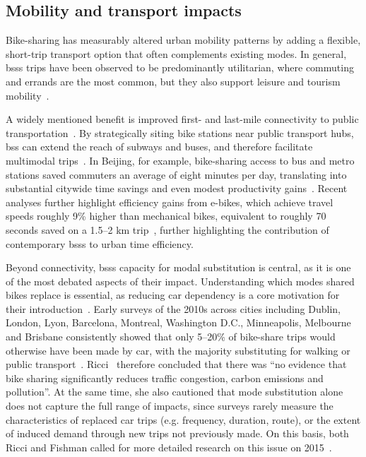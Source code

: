 \subsection{Mobility and transport impacts}

    Bike-sharing has measurably altered urban mobility patterns by adding a flexible, short-trip transport option that often complements existing modes. In general, \acp{bss} trips have been observed to be predominantly utilitarian, where commuting and errands are the most common, but they also support leisure and tourism mobility~\cite{Ricci2015}. 

    A widely mentioned benefit is improved first- and last-mile connectivity to public transportation~\cite{Shaheen2010, Qiu2018}. By strategically siting bike stations near public transport hubs, \ac{bss} can extend the reach of subways and buses, and therefore facilitate multimodal trips~\cite{Cheng2022}. In Beijing, for example, bike-sharing access to bus and metro stations saved commuters an average of eight minutes per day, translating into substantial citywide time savings and even modest productivity gains~\cite{Qiu2018}. Recent analyses further highlight efficiency gains from e-bikes, which achieve travel speeds roughly 9\% higher than mechanical bikes, equivalent to roughly 70 seconds saved on a 1.5--2 km trip~\cite{Waldner2025}, further highlighting the contribution of contemporary \acp{bss} to urban time efficiency.  

    Beyond connectivity, \acp{bss} capacity for modal substitution is central, as it is one of the most debated aspects of their impact. Understanding which modes shared bikes replace is essential, as reducing car dependency is a core motivation for their introduction~\cite{Fishman2016}. Early surveys of the 2010s across cities including Dublin, London, Lyon, Barcelona, Montreal, Washington D.C., Minneapolis, Melbourne and Brisbane consistently showed that only 5--20\% of bike-share trips would otherwise have been made by car, with the majority substituting for walking or public transport~\cite{Murphy2015, Fishman2013, Fishman2014, Bachand-Marleau2012}. Ricci~\cite{Ricci2015} therefore concluded that there was “no evidence that bike sharing significantly reduces traffic congestion, carbon emissions and pollution”. At the same time, she also cautioned that mode substitution alone does not capture the full range of impacts, since surveys rarely measure the characteristics of replaced car trips (e.g. frequency, duration, route), or the extent of induced demand through new trips not previously made. On this basis, both Ricci and Fishman called for more detailed research on this issue on 2015~\cite{Ricci2015, Fishman2016}.  

